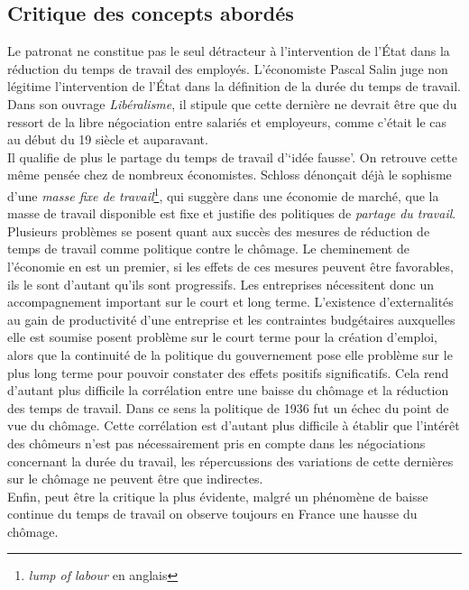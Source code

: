 \documentclass[main.tex]{subfiles}
\begin{document}
        \subsection{Critique des concepts abordés}
        Le patronat ne constitue pas le seul détracteur à l'intervention de l'État dans la réduction du temps de travail des employés. L'économiste Pascal Salin juge non légitime l'intervention de l'État dans la définition de la durée du temps de travail. Dans son ouvrage \textit{Libéralisme}, il stipule que cette dernière ne devrait être que du ressort de la libre négociation entre salariés et employeurs, comme c'était le cas au début du 19 siècle et auparavant. \\
        Il qualifie de plus le partage du temps de travail d'`idée fausse'. On retrouve cette même pensée chez de nombreux économistes. Schloss dénonçait déjà le sophisme d'une \emph{masse fixe de travail}\footnote{\emph{lump of labour} en anglais}, qui suggère dans une économie de marché, que la masse de travail disponible est fixe et justifie des politiques de \emph{partage du travail}. \\

        Plusieurs problèmes se posent quant aux succès des mesures de réduction de temps de travail comme politique contre le chômage. Le cheminement de l'économie en est un premier, si les effets de ces mesures peuvent être favorables, ils le sont d'autant qu'ils sont progressifs. Les entreprises nécessitent donc un accompagnement important sur le court et long terme. L'existence d'externalités au gain de productivité d'une entreprise et les contraintes budgétaires auxquelles elle est soumise posent problème sur le court terme pour la création d'emploi, alors que la continuité de la politique du gouvernement pose elle problème sur le plus long terme pour pouvoir constater des effets positifs significatifs. Cela rend d'autant plus difficile la corrélation entre une baisse du chômage et la réduction des temps de travail. Dans ce sens la politique de 1936 fut un échec du point de vue du chômage. Cette corrélation est d'autant plus difficile à établir que l'intérêt des chômeurs n'est pas nécessairement pris en compte dans les négociations concernant la durée du travail, les répercussions des variations de cette dernières sur le chômage ne peuvent être que indirectes. \\

        Enfin, peut être la critique la plus évidente, malgré un phénomène de baisse continue du temps de travail on observe toujours en France une hausse du chômage.
\end{document}
